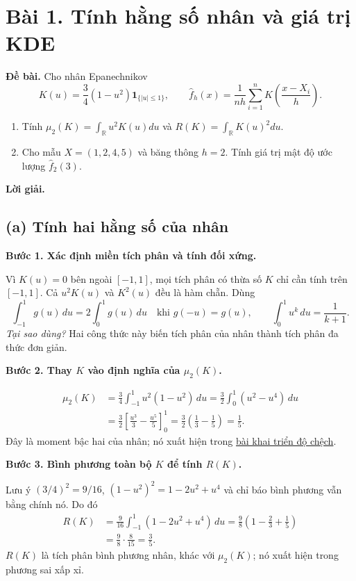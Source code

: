 \documentclass[11pt,a4paper]{article}
\newcommand{\R}{\mathbb R}
\newcommand{\buoc}[1]{\par\medskip\textbf{#1}\par}
\begin{document}
\section*{Bài 1. Tính hằng số nhân và giá trị KDE}\label{core:calculation}
\textbf{Đề bài.} Cho nhân Epanechnikov
\[
K(u)=\frac34(1-u^2)\mathbf1_{\{|u|\leq1\}},\qquad
\widehat f_h(x)=\frac1{nh}\sum_{i=1}^nK\left(\frac{x-X_i}{h}\right).
\]
\begin{enumerate}[label=(\alph*)]
\item Tính $\mu_2(K)=\int_{\R}u^2K(u)du$ và $R(K)=\int_{\R}K(u)^2du$.
\item Cho mẫu $X=(1,2,4,5)$ và băng thông $h=2$. Tính giá trị mật độ ước lượng $\widehat f_2(3)$.
\end{enumerate}
\textbf{Lời giải.}
\subsection*{(a) Tính hai hằng số của nhân}
\buoc{Bước 1. Xác định miền tích phân và tính đối xứng.}
Vì $K(u)=0$ bên ngoài $[-1,1]$, mọi tích phân có thừa số $K$ chỉ cần tính trên $[-1,1]$. Cả $u^2K(u)$ và $K^2(u)$ đều là hàm chẵn. Dùng
\[
\int_{-1}^1g(u)\,du=2\int_0^1g(u)\,du\quad\text{khi }g(-u)=g(u),
\qquad \int_0^1u^k\,du=\frac{1}{k+1}.
\]
\textit{Tại sao dùng?} Hai công thức này biến tích phân của nhân thành tích phân đa thức đơn giản.

\buoc{Bước 2. Thay $K$ vào định nghĩa của $\mu_2(K)$.}
\begin{align*}
\mu_2(K)&=\frac34\int_{-1}^1u^2(1-u^2)\,du
=\frac32\int_0^1(u^2-u^4)\,du\\
&=\frac32\left[\frac{u^3}{3}-\frac{u^5}{5}\right]_0^1
=\frac32\left(\frac13-\frac15\right)
=\boxed{\frac15}.
\end{align*}
Đây là moment bậc hai của nhân; nó xuất hiện trong \hyperref[core:bias]{bài khai triển độ chệch}.

\buoc{Bước 3. Bình phương toàn bộ $K$ để tính $R(K)$.}
Lưu ý $(3/4)^2=9/16$, $(1-u^2)^2=1-2u^2+u^4$ và chỉ báo bình phương vẫn bằng chính nó. Do đó
\begin{align*}
R(K)&=\frac9{16}\int_{-1}^1(1-2u^2+u^4)\,du
=\frac98\left(1-\frac23+\frac15\right)\\
&=\frac98\cdot\frac8{15}=\boxed{\frac35}.
\end{align*}
$R(K)$ là tích phân bình phương nhân, khác với $\mu_2(K)$; nó xuất hiện trong phương sai xấp xỉ.
\end{document}
